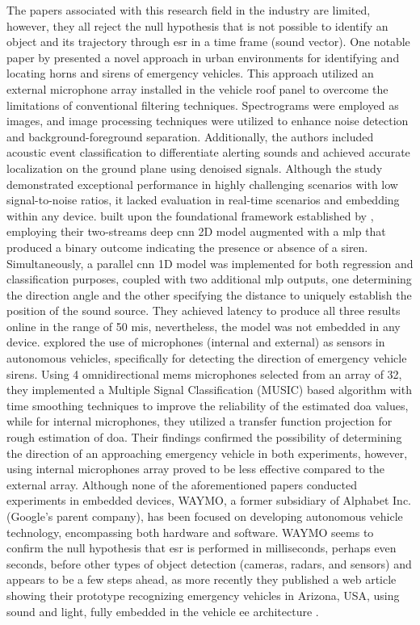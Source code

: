 The papers associated with this research field in the industry are limited, however, they all reject the null hypothesis that is not possible to identify an object and its trajectory through \gls{esr} in a time frame (sound vector). One notable paper by \textcite{Marchegiani2022} presented a novel approach in urban environments for identifying and locating horns and sirens of emergency vehicles. This approach utilized an external microphone array installed in the vehicle roof panel to overcome the limitations of conventional filtering techniques. Spectrograms were employed as images, and image processing techniques were utilized to enhance noise detection and background-foreground separation. Additionally, the authors included acoustic event classification to differentiate alerting sounds and achieved accurate localization on the ground plane using denoised signals. Although the study demonstrated exceptional performance in highly challenging scenarios with low signal-to-noise ratios, it lacked evaluation in real-time scenarios and embedding within any device. \textcite{Sun2021} built upon the foundational framework established by \textcite{Tran2020}, employing their two-streams deep \gls{cnn} 2D model augmented with a \gls{mlp} that produced a binary outcome indicating the presence or absence of a siren. Simultaneously, a parallel \gls{cnn} 1D model was implemented for both regression and classification purposes, coupled with two additional \gls{mlp} outputs, one determining the direction angle and the other specifying the distance to uniquely establish the position of the sound source. They achieved latency to produce all three results online in the range of 50 \gls{mi}\gls{s}, nevertheless, the model was not embedded in any device. \textcite{Shabtai2019} explored the use of microphones (internal and external) as sensors in autonomous vehicles, specifically for detecting the direction of emergency vehicle sirens. Using 4 omnidirectional \gls{mems} microphones selected from an array of 32, they implemented a Multiple Signal Classification (MUSIC) based algorithm with time smoothing techniques to improve the reliability of the estimated \gls{doa} values, while for internal microphones, they utilized a transfer function projection for rough estimation of \gls{doa}. Their findings confirmed the possibility of determining the direction of an approaching emergency vehicle in both experiments, however, using internal microphones array proved to be less effective compared to the external array. Although none of the aforementioned papers conducted experiments in embedded devices, WAYMO, a former subsidiary of Alphabet Inc. (Google's parent company), has been focused on developing autonomous vehicle technology, encompassing both hardware and software. WAYMO seems to confirm the null hypothesis that \gls{esr} is performed in milliseconds, perhaps even seconds, before other types of object detection (cameras, radars, and sensors) and appears to be a few steps ahead, as more recently they published a web article showing their prototype recognizing emergency vehicles in Arizona, USA, using sound and light, fully embedded in the vehicle \gls{ee} architecture \cite{WAYMO2023}. 


